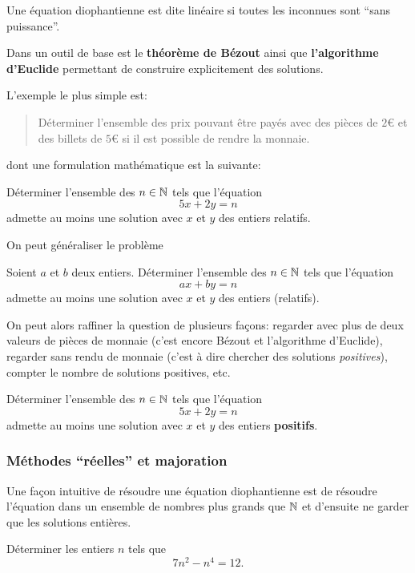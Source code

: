 Une équation diophantienne est dite linéaire si toutes les inconnues
sont ``sans puissance''.

Dans un outil de base est le \textbf{théorème de Bézout} ainsi que
\textbf{l'algorithme d'Euclide} permettant de construire explicitement
des solutions.

L'exemple le plus simple est:

\begin{quote}
  Déterminer l'ensemble des prix pouvant être payés avec des pièces de $2€$ et des billets de $5€$ si il est possible de rendre la monnaie.
\end{quote}

dont une formulation mathématique est la suivante:

\begin{exo}
  Déterminer l'ensemble des $n \in \mathbb N$ tels que l'équation
  $$5x+2y=n$$
  admette au moins une solution avec $x$ et $y$ des entiers relatifs.
\end{exo}

On peut généraliser le problème

\begin{exo}
  Soient $a$ et $b$ deux entiers.
  Déterminer l'ensemble des $n \in \mathbb N$ tels que l'équation
  $$ax+by=n$$
  admette au moins une solution avec $x$ et $y$ des entiers (relatifs).
\end{exo}


On peut alors raffiner la question de plusieurs façons: regarder avec plus de deux valeurs de pièces de monnaie (c'est encore Bézout et l'algorithme d'Euclide), regarder sans rendu de monnaie (c'est à dire chercher des solutions \emph{positives}), compter le nombre de solutions positives, etc.


\begin{exo}
  Déterminer l'ensemble des $n \in \mathbb N$ tels que l'équation
  $$5x+2y=n$$
  admette au moins une solution avec $x$ et $y$ des entiers \textbf{positifs}.
\end{exo}

\subsubsection{Méthodes ``réelles'' et majoration}

Une façon intuitive de résoudre une équation diophantienne est de résoudre l'équation dans un ensemble de nombres plus grands que $\mathbb N$ et d'ensuite ne garder que les solutions entières.

\begin{exo}
  Déterminer les entiers $n$ tels que
  $$7 n^2 - n^4 = 12. $$
\end{exo}


